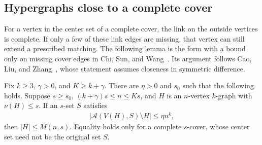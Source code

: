 \subsection{Hypergraphs close to a complete cover}

For a vertex in the center set of a complete cover, the link on the outside vertices is complete. If only a few of these link edges are missing, that vertex can still extend a prescribed matching. The following lemma is the form with a bound only on missing cover edges in Chi, Sun, and Wang~\cite[Lemma 8.6]{CSW2026}. Its argument follows Cao, Liu, and Zhang~\cite[Lemma 5.2]{CLZ2026}, whose statement assumes closeness in symmetric difference.
\begin{lemma}\label{lem:cover-exact}
Fix $k\ge3$, $\gamma>0$, and $K\ge k+\gamma$. There are $\eta>0$ and $s_0$ such that the following holds. Suppose $s\ge s_0$, $(k+\gamma)s\le n\le Ks$, and $H$ is an $n$-vertex $k$-graph with $\nu(H)\le s$. If an $s$-set $S$ satisfies
\begin{align*}
|\mathcal A(V(H),S)\setminus H|\le\eta n^k,
\end{align*}
then $|H|\le M(n,s)$. Equality holds only for a complete $s$-cover, whose center set need not be the original set $S$.
\end{lemma}
